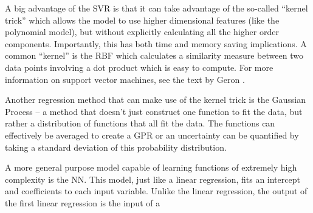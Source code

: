 A big advantage of the \gls{SVR} is that it can take advantage of the so-called ``kernel trick'' which allows the model to use higher dimensional features (like the polynomial model), but without explicitly calculating all the higher order components. Importantly, this has both time and memory saving implications. A common ``kernel'' is the \gls{RBF} which calculates a similarity measure between two data points involving a dot product which is easy to compute. For more information on support vector machines, see the text by Geron \cite{Geron_2023_ML}. 

Another regression method that can make use of the kernel trick is the Gaussian Process -- a method that doesn't just construct one function to fit the data, but rather a distribution of functions that all fit the data. The functions can effectively be averaged to create a \gls{GPR} or an uncertainty can be quantified by taking a standard deviation of this probability distribution. 

A more general purpose model capable of learning functions of extremely high complexity is the \gls{NN}. This model, just like a linear regression, fits an intercept and coefficients to each input variable. Unlike the linear regression, the output of the first linear regression is the input of a 
